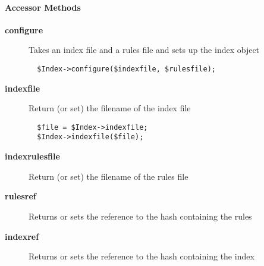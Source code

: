 \paragraph*{Accessor Methods\label{ORAC::Index_Accessor_Methods}}\begin{description}
\item[\textbf{configure}] \mbox{}

Takes an index file and a rules file and sets up the index object

\begin{verbatim}
  $Index->configure($indexfile, $rulesfile);
\end{verbatim}
\item[\textbf{indexfile}] \mbox{}

Return (or set) the filename of the index file

\begin{verbatim}
  $file = $Index->indexfile;
  $Index->indexfile($file);
\end{verbatim}
\item[\textbf{indexrulesfile}] \mbox{}

Return (or set) the filename of the rules file

\item[\textbf{rulesref}] \mbox{}

Returns or sets the reference to the hash containing the rules

\item[\textbf{indexref}] \mbox{}

Returns or sets the reference to the hash containing the index

\end{description}
